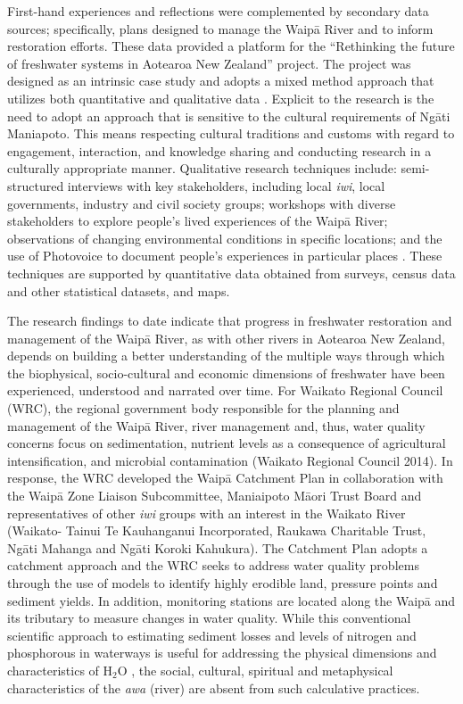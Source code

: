 \documentclass[10pt,a4paper]{article}
\begin{document}
\begin{multicols}{2}
First-hand experiences and reflections were complemented by secondary data sources; specifically, plans designed to manage the Waip\={a} River and to inform restoration efforts. These data provided a platform for the ``Rethinking the future of freshwater systems in Aotearoa New Zealand'' project. The project was designed as an intrinsic case study \citep{r40} and adopts a mixed method approach that utilizes both quantitative and qualitative data \citep{r41}. Explicit to the research is the need to adopt an approach that is sensitive to the cultural requirements of Ng\={a}ti Maniapoto. This means respecting cultural traditions and customs with regard to engagement, interaction, and knowledge sharing and conducting research in a culturally appropriate manner. Qualitative research techniques include: semi-structured interviews with key stakeholders, including local \textit{iwi}, local governments, industry and civil society groups; workshops with diverse stakeholders to explore people's lived experiences of the Waip\={a} River; observations of changing environmental conditions in specific locations; and the use of Photovoice to document people's experiences in particular places \citep{r42}. These techniques are supported by quantitative data obtained from surveys, census data and other statistical datasets, and maps.

The research findings to date indicate that progress in freshwater restoration and management of the Waip\={a} River, as with other rivers in Aotearoa New Zealand, depends on building a better understanding of the multiple ways through which the biophysical, socio-cultural and economic dimensions of freshwater have been experienced, understood and narrated over time. For Waikato Regional Council (WRC), the regional government body responsible for the planning and management of the Waip\={a} River, river management and, thus, water quality concerns focus on sedimentation, nutrient levels as a consequence of agricultural intensification, and microbial contamination (Waikato Regional Council 2014). In response, the WRC developed the Waip\={a} Catchment Plan in collaboration with the Waip\={a} Zone Liaison Subcommittee, Maniaipoto M\={a}ori Trust Board and representatives of other \textit{iwi} groups with an interest in the Waikato River (Waikato- Tainui Te Kauhanganui Incorporated, Raukawa Charitable Trust, Ng\={a}ti Mahanga and Ng\={a}ti Koroki Kahukura). The Catchment Plan adopts a catchment approach and the WRC seeks to address water quality problems through the use of models to identify highly erodible land, pressure points and sediment yields. In addition, monitoring stations are located along the Waip\={a} and its tributary to measure changes in water quality. While this conventional scientific approach to estimating sediment losses and levels of nitrogen and phosphorous in waterways is useful for addressing the physical dimensions and characteristics of H$_2$O \citep{r43}, the social, cultural, spiritual and metaphysical characteristics of the \textit{awa} (river) are absent from such calculative practices.


\end{multicols}
\end{document}
